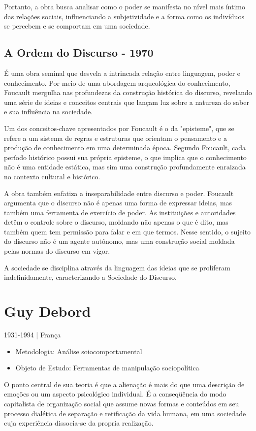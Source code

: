 \documentclass{article}
\begin{document}
\begin{multicols}{2}
Portanto, a obra busca analisar como o poder se manifesta no nível mais íntimo das relações sociais, influenciando a subjetividade e a forma como os indivíduos se percebem e se comportam em uma sociedade.

\subsection*{A Ordem do Discurso - 1970}
 É uma obra seminal que desvela a intrincada relação entre linguagem, poder e conhecimento. Por meio de uma abordagem arqueológica do conhecimento, Foucault mergulha nas profundezas da construção histórica do discurso, revelando uma série de ideias e conceitos centrais que lançam luz sobre a natureza do saber e sua influência na sociedade.

Um dos conceitos-chave apresentados por Foucault é o da "episteme", que se refere a um sistema de regras e estruturas que orientam o pensamento e a produção de conhecimento em uma determinada época. Segundo Foucault, cada período histórico possui sua própria episteme, o que implica que o conhecimento não é uma entidade estática, mas sim uma construção profundamente enraizada no contexto cultural e histórico.

A obra também enfatiza a inseparabilidade entre discurso e poder. Foucault argumenta que o discurso não é apenas uma forma de expressar ideias, mas também uma ferramenta de exercício de poder. As instituições e autoridades detêm o controle sobre o discurso, moldando não apenas o que é dito, mas também quem tem permissão para falar e em que termos. Nesse sentido, o sujeito do discurso não é um agente autônomo, mas uma construção social moldada pelas normas do discurso em vigor.

A sociedade se disciplina através da linguagem das ideias que se
proliferam indefinidamente, caracterizando a Sociedade do Discurso.


\end{multicols}
\newpage
\section*{Guy Debord}
\begin{flushright} 1931-1994 | França \end{flushright}
\begin{itemize}
    \item Metodologia: Análise soiocomportamental
    \item Objeto de Estudo: Ferramentas de manipulação sociopolítica 
\end{itemize}
O ponto central de sua teoria é que a alienação é mais do que uma descrição de emoções ou um aspecto psicológico individual. É a conseqüência do modo capitalista de organização social que assume novas formas e conteúdos em seu processo dialética de separação e retificação da vida humana, em uma sociedade cuja experiência dissocia-se da propria realização.
\end{document}
